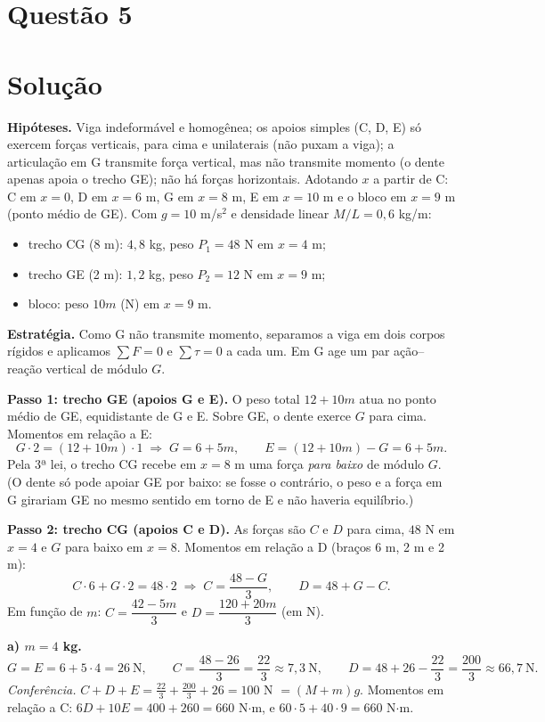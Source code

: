 \documentclass{article}%
\begin{document}
\section*{Questão 5}

\section*{Solução}

\textbf{Hipóteses.} Viga indeformável e homogênea; os apoios simples (C, D, E) só exercem forças verticais, para cima e unilaterais (não puxam a viga); a articulação em G transmite força vertical, mas não transmite momento (o dente apenas apoia o trecho GE); não há forças horizontais. Adotando $x$ a partir de C: C em $x=0$, D em $x=6$ m, G em $x=8$ m, E em $x=10$ m e o bloco em $x=9$ m (ponto médio de GE). Com $g=10$ m/s$^2$ e densidade linear $M/L=0{,}6$ kg/m:

\begin{itemize}
\item trecho CG (8 m): $4{,}8$ kg, peso $P_1=48$ N em $x=4$ m;
\item trecho GE (2 m): $1{,}2$ kg, peso $P_2=12$ N em $x=9$ m;
\item bloco: peso $10m$ (N) em $x=9$ m.
\end{itemize}

\textbf{Estratégia.} Como G não transmite momento, separamos a viga em dois corpos rígidos e aplicamos $\sum F=0$ e $\sum \tau=0$ a cada um. Em G age um par ação--reação vertical de módulo $G$.

\textbf{Passo 1: trecho GE (apoios G e E).} O peso total $12+10m$ atua no ponto médio de GE, equidistante de G e E. Sobre GE, o dente exerce $G$ para cima. Momentos em relação a E:
\[
G\cdot 2=(12+10m)\cdot 1 \;\Rightarrow\; G=6+5m,
\qquad
E=(12+10m)-G=6+5m .
\]
Pela 3ª lei, o trecho CG recebe em $x=8$ m uma força \emph{para baixo} de módulo $G$. (O dente só pode apoiar GE por baixo: se fosse o contrário, o peso e a força em G girariam GE no mesmo sentido em torno de E e não haveria equilíbrio.)

\textbf{Passo 2: trecho CG (apoios C e D).} As forças são $C$ e $D$ para cima, $48$ N em $x=4$ e $G$ para baixo em $x=8$. Momentos em relação a D (braços 6 m, 2 m e 2 m):
\[
C\cdot 6+G\cdot 2=48\cdot 2 \;\Rightarrow\; C=\frac{48-G}{3},
\qquad
D=48+G-C .
\]
Em função de $m$: $C=\dfrac{42-5m}{3}$ e $D=\dfrac{120+20m}{3}$ (em N).

\textbf{a) $m=4$ kg.}
\[
G=E=6+5\cdot 4=26\ \text{N},\qquad
C=\frac{48-26}{3}=\frac{22}{3}\approx 7{,}3\ \text{N},\qquad
D=48+26-\frac{22}{3}=\frac{200}{3}\approx 66{,}7\ \text{N}.
\]
\emph{Conferência.} $C+D+E=\tfrac{22}{3}+\tfrac{200}{3}+26=100$ N $=(M+m)g$. Momentos em relação a C: $6D+10E=400+260=660$ N$\cdot$m, e $60\cdot5+40\cdot 9=660$ N$\cdot$m.
\end{document}
